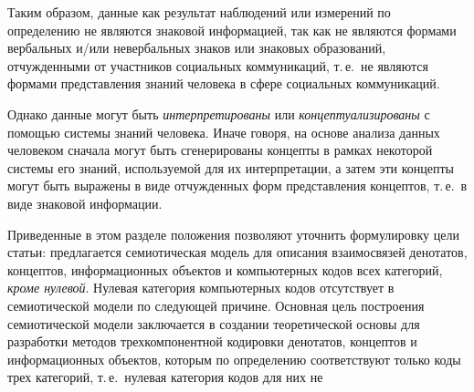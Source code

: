 \begin{multicols}{2}
   Таким образом, данные как результат наблюдений или измерений по определению не 
являются знаковой информацией, так как не являются формами вербальных и/или 
невербальных знаков или знаковых образований, отчужденными от участников социальных 
коммуникаций, т.\,е.\ не являются формами представления знаний человека в сфере 
социальных коммуникаций.
   
   Однако данные могут быть \textit{интерпретированы} или \textit{концептуализированы} 
с помощью системы знаний человека. Иначе говоря, на основе анализа данных человеком 
сначала могут быть сгенерированы концепты в рамках некоторой системы его знаний, 
используемой для их интерпретации, а затем эти концепты могут быть выражены в виде 
отчужденных форм представления концептов, т.\,е.\ в виде знаковой информации.
   
   Приведенные в этом разделе положения позволяют уточнить формулировку цели статьи: 
предлагается семиотическая модель для описания взаимосвязей денотатов, концептов, 
информационных объектов и компьютерных кодов всех категорий, \textit{кроме нулевой}. 
Нулевая категория компьютерных\linebreak
кодов отсутствует в семиотической модели по следующей 
причине. Основная цель по\-стро\-ения семиотической модели заключается в создании 
теоретической основы для разработки методов\linebreak
 трехкомпонентной кодировки денотатов, 
концептов и информационных объектов, которым по определению соответствуют только 
коды трех категорий, т.\,е.\ нулевая категория кодов для них не\linebreak\vspace*{-12pt}
\pagebreak

\end{multicols}

\begin{figure} %
\vspace*{2pt}
\begin{center}
\vspace*{1pt}
\mbox{%
\epsfxsize=163.053mm
}
\end{center}
\vspace*{-6pt}
\vspace*{12pt}
\end{figure}

